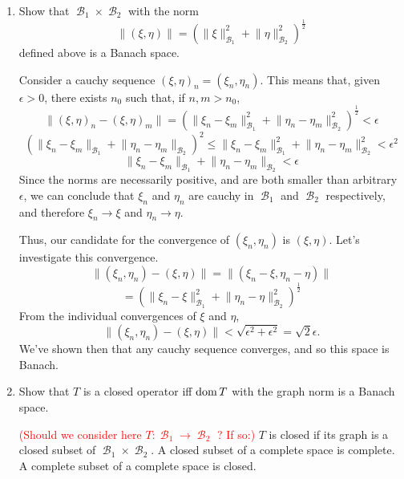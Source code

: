 \documentclass{article}
\theoremstyle{exercisestyle}
\newenvironment{exercise}[1]
  {\renewcommand\theinnerex{#1}\innerex}
  {\endinnerex}
\newcommand{\norm}[1]{\lVert #1 \rVert}
\DeclareMathOperator{\banach}{\mathcal{B}}
\begin{document}
\begin{exercise}{1.2.9}


    \begin{enumerate}

        \item Show that $\banach_1 \times \banach_2$ with the norm
              $$\norm{(\xi, \eta)} = \left(\norm{\xi}^2_{\banach_1} + \norm{\eta}^2_{\banach_2}\right)^{\frac{1}{2}}$$
              defined above is a Banach space.

              Consider a cauchy sequence $(\xi,\eta)_n=(\xi_n, \eta_n)$. This means that, given $\epsilon>0$, there exists $n_0$ such that, if $n, m > n_0$,
              $$ \norm{(\xi,\eta)_n - (\xi,\eta)_m} = \left(\norm{\xi_n - \xi_m}^2_{\banach_1} + \norm{\eta_n-\eta_m}^2_{\banach_2}\right)^{\frac{1}{2}} < \epsilon$$
              $$ \left(\norm{\xi_n-\xi_m}_{\banach_1} + \norm{\eta_n - \eta_m}_{\banach_2}\right)^2 \leq \norm{\xi_n-\xi_m}^2_{\banach_1} + \norm{\eta_n - \eta_m}^2_{\banach_2} < \epsilon^2$$
              $$ \norm{\xi_n-\xi_m}_{\banach_1} + \norm{\eta_n - \eta_m}_{\banach_2} < \epsilon$$
              Since the norms are necessarily positive, and are both smaller than arbitrary $\epsilon$, we can conclude that $\xi_n$ and $\eta_n$ are cauchy
              in $\banach_1$ and $\banach_2$ respectively, and therefore $\xi_n \to \xi$ and $\eta_n \to \eta$.

              Thus, our candidate for the convergence of $(\xi_n,\eta_n)$ is $(\xi,\eta)$. Let's investigate this convergence.
              $$ \norm{(\xi_n,\eta_n) - (\xi,\eta)} = \norm{(\xi_n-\xi,\eta_n-\eta)} $$
              $$ = \left(\norm{\xi_n-\xi}^2_{\banach_1} + \norm{\eta_n-\eta}^2_{\banach_2}\right)^{\frac{1}{2}}$$
              From the individual convergences of $\xi$ and $\eta$,
              $$ \norm{(\xi_n,\eta_n) - (\xi,\eta)} < \sqrt{\epsilon^2 + \epsilon^2} = \sqrt{2} \epsilon. $$
              We've shown then that any cauchy sequence converges, and so this space is Banach.


        \item Show that $T$ is a closed operator iff $\operatorname{dom} T$ with the graph norm is a Banach space.

              \textcolor{red}{(Should we consider here $T: \banach_1 \to \banach_2$ ? If so:)}
              $T$ is closed if its graph is a closed subset of $\banach_1 \times \banach_2$. A closed subset of a complete space is complete.
              A complete subset of a complete space is closed.
    \end{enumerate}

\end{exercise}
\end{document}
